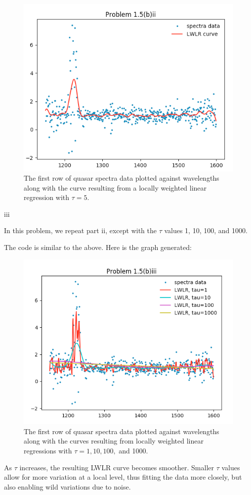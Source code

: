 \documentclass[]{article}
\begin{document}
\begin{figure}[htbp]
\centering
\includegraphics{images/pr1_5bii.png}
\caption{The first row of quasar spectra data plotted against
wavelengths along with the curve resulting from a locally weighted
linear regression with \(\tau = 5.\)}
\end{figure}

iii

In this problem, we repeat part ii, except with the \(\tau\) values 1,
10, 100, and 1000.

The code is similar to the above. Here is the graph generated:

\begin{figure}[htbp]
\centering
\includegraphics{images/pr1_5biii.png}
\caption{The first row of quasar spectra data plotted against
wavelengths along with the curves resulting from locally weighted linear
regressions with \(\tau = 1, 10, 100,\) and 1000.}
\end{figure}

As \(\tau\) increases, the resulting LWLR curve becomes smoother.
Smaller \(\tau\) values allow for more variation at a local level, thus
fitting the data more closely, but also enabling wild variations due to
noise.
\end{document}

